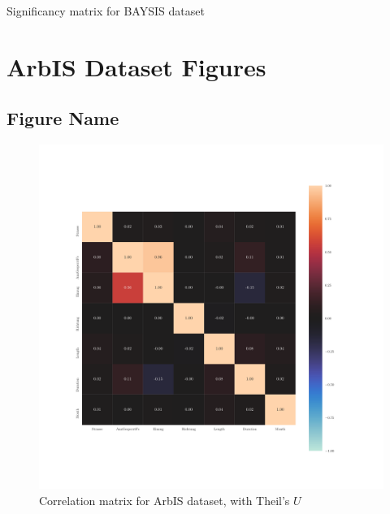 \documentclass[a4paper,12pt]{report}
\newcommand{\nocontentsline}[3]{}
\newcommand{\tocless}[2]{\bgroup\let\addcontentsline=\nocontentsline#1{#2}\egroup}
\begin{document}
\begin{appendices}
\begin{table} %
\tiny
\setlength{\tabcolsep}{4pt}
\centering

\caption{Significancy matrix for BAYSIS dataset}
\end{table} %
\restoregeometry


\chapter{ArbIS Dataset Figures}
\tocless\section{Figure Name}
\label{appendix_TODO}

\label{appendix_baysis_dataset_corr_theils}
\begin{figure}[h]
	\centering
	\includegraphics[scale=0.8]{../CorrAnalysis/data/ArbIS/01_dataset/plots/arbis_dataset_corr_theils}
	\caption{Correlation matrix for ArbIS dataset, with Theil's $U$}
	\label{img:appendix_correlation_matrix_dataset_theils}
\end{figure}
\restoregeometry


\end{appendices}
\end{document}
